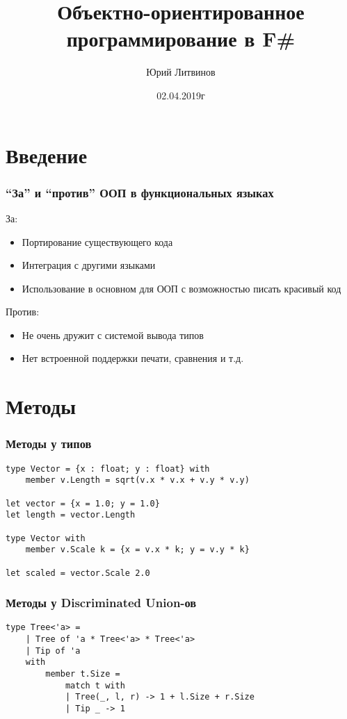 \documentclass[xetex,mathserif,serif]{beamer}
\title{Объектно-ориентированное программирование в F\#}
\author{Юрий Литвинов}
\date{02.04.2019г}
\begin{document}
	
	\frame{\titlepage}
	
	\section{Введение}

	\begin{frame}
		\frametitle{``За'' и ``против'' ООП в функциональных языках}
		За:
		\begin{itemize}
			\item Портирование существующего кода
			\item Интеграция с другими языками
			\item Использование в основном для ООП с возможностью писать красивый код
		\end{itemize}
		
		Против:
		\begin{itemize}
			\item Не очень дружит с системой вывода типов
			\item Нет встроенной поддержки печати, сравнения и т.д.
		\end{itemize}
	\end{frame}
	
	\section{Методы}
	
	\begin{frame}[fragile]
		\frametitle{Методы у типов}
		\begin{verbatim}
type Vector = {x : float; y : float} with
    member v.Length = sqrt(v.x * v.x + v.y * v.y)

let vector = {x = 1.0; y = 1.0}
let length = vector.Length

type Vector with
    member v.Scale k = {x = v.x * k; y = v.y * k}

let scaled = vector.Scale 2.0
		\end{verbatim}
	\end{frame}

	\begin{frame}[fragile]
		\frametitle{Методы у Discriminated Union-ов}
		\begin{verbatim}
type Tree<'a> =
    | Tree of 'a * Tree<'a> * Tree<'a>
    | Tip of 'a
    with
        member t.Size = 
            match t with
            | Tree(_, l, r) -> 1 + l.Size + r.Size
            | Tip _ -> 1
		\end{verbatim}
	\end{frame}
\end{document}
